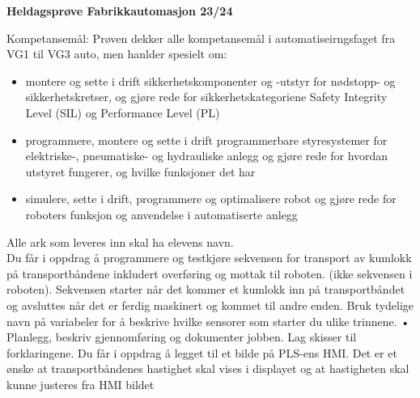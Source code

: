 
\huge
\centerline{\bf Heldagsprøve Fabrikkautomasjon 23/24}  \bigskip
\normalsize
\vskip 1cm 
Kompetansemål:
Prøven dekker alle kompetansemål i automatiseirngsfaget fra VG1 til VG3 auto, men hanlder spesielt om:
\begin{itemize}[noitemsep]

\item montere og sette i drift sikkerhetskomponenter og -utstyr for nødstopp- og sikkerhetskretser, og gjøre rede for sikkerhetskategoriene Safety Integrity Level (SIL) og Performance Level (PL)
\item programmere, montere og sette i drift programmerbare styresystemer for elektriske-, pneumatiske- og hydrauliske anlegg og gjøre rede for hvordan utstyret fungerer, og hvilke funksjoner det har
\item simulere, sette i drift, programmere og optimalisere robot og gjøre rede for roboters funksjon og anvendelse i automatiserte anlegg
\end{itemize}

Alle ark som leveres inn skal ha elevens navn. \\ 

\oppgave{}%
Du får i oppdrag å programmere og testkjøre sekvensen for transport av kumlokk på transportbåndene inkludert overføring og mottak til roboten. (ikke sekvensen i roboten). Sekvensen starter når det kommer et kumlokk inn på transportbåndet og avsluttes når det er ferdig maskinert og kommet til andre enden. Bruk tydelige navn på variabeler for å beskrive hvilke sensorer som starter du ulike trinnene. 
\vskip 1cm
• Planlegg, beskriv gjennomføring og dokumenter jobben. Lag skisser til forklaringene. 
\vskip 1cm
\oppgave{}%
 Du får i oppdrag å legget til et bilde på PLS-ens HMI. Det er et ønske at transportbåndenes hastighet skal vises i displayet og at hastigheten skal kunne justeres fra HMI bildet  

